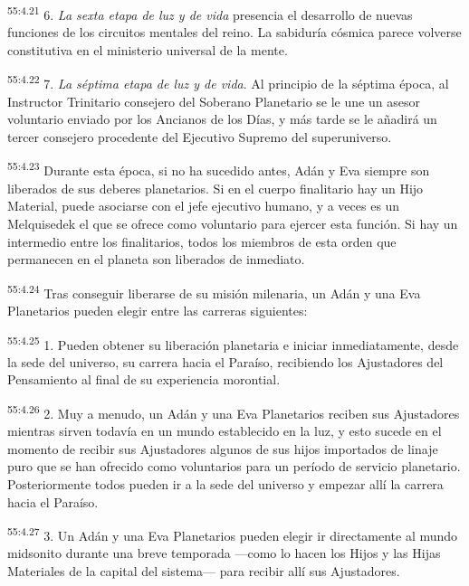 \par
\textsuperscript{55:4.21} 6. \textit{La sexta etapa de luz y de vida} presencia el desarrollo de nuevas funciones de los circuitos mentales del reino. La sabiduría cósmica parece volverse constitutiva en el ministerio universal de la mente.

\par
\textsuperscript{55:4.22} 7. \textit{La séptima etapa de luz y de vida}. Al principio de la séptima época, al Instructor Trinitario consejero del Soberano Planetario se le une un asesor voluntario enviado por los Ancianos de los Días, y más tarde se le añadirá un tercer consejero procedente del Ejecutivo Supremo del superuniverso.

\par
\textsuperscript{55:4.23} Durante esta época, si no ha sucedido antes, Adán y Eva siempre son liberados de sus deberes planetarios. Si en el cuerpo finalitario hay un Hijo Material, puede asociarse con el jefe ejecutivo humano, y a veces es un Melquisedek el que se ofrece como voluntario para ejercer esta función. Si hay un intermedio entre los finalitarios, todos los miembros de esta orden que permanecen en el planeta son liberados de inmediato.

\par
\textsuperscript{55:4.24} Tras conseguir liberarse de su misión milenaria, un Adán y una Eva Planetarios pueden elegir entre las carreras siguientes:

\par
\textsuperscript{55:4.25} 1. Pueden obtener su liberación planetaria e iniciar inmediatamente, desde la sede del universo, su carrera hacia el Paraíso, recibiendo los Ajustadores del Pensamiento al final de su experiencia morontial.

\par
\textsuperscript{55:4.26} 2. Muy a menudo, un Adán y una Eva Planetarios reciben sus Ajustadores mientras sirven todavía en un mundo establecido en la luz, y esto sucede en el momento de recibir sus Ajustadores algunos de sus hijos importados de linaje puro que se han ofrecido como voluntarios para un período de servicio planetario. Posteriormente todos pueden ir a la sede del universo y empezar allí la carrera hacia el Paraíso.

\par
\textsuperscript{55:4.27} 3. Un Adán y una Eva Planetarios pueden elegir ir directamente al mundo midsonito durante una breve temporada ---como lo hacen los Hijos y las Hijas Materiales de la capital del sistema--- para recibir allí sus Ajustadores.

